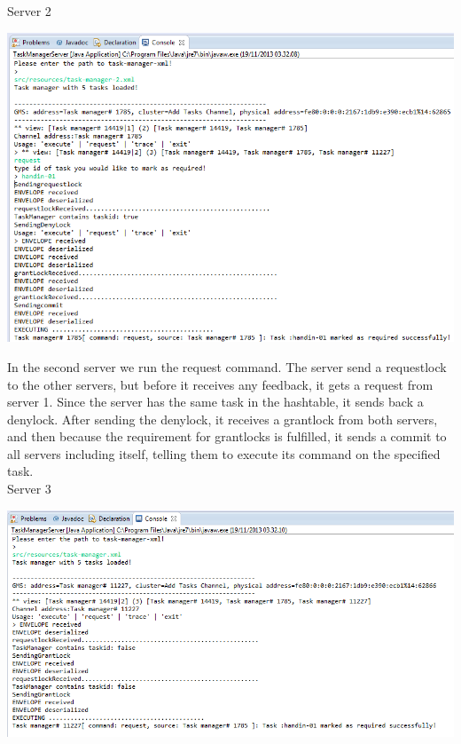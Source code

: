 \caption{Server 2}
\includegraphics[scale=0.6]{images/CCServer2.png}

In the second server we run the request command. The server send a requestlock to the other servers, but before it receives any feedback, it gets a request from server 1. Since the server has the same task in the hashtable, it sends back a denylock. After sending the denylock, it receives a grantlock from both servers, and then because the requirement for grantlocks is fulfilled, it sends a commit to all servers including itself, telling them to execute its command on the specified task. \\

\caption{Server 3}
\includegraphics[scale=0.6]{images/CCServer3.png}

